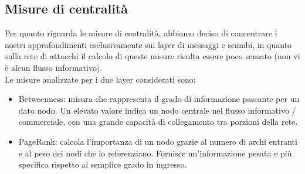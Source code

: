\subsection{Misure di centralità}
\label{subsec:centrality}
Per quanto riguarda le misure di centralità, abbiamo deciso di concentrare i nostri approfondimenti esclusivamente sui layer di messaggi e scambi, in quanto sulla rete di attacchi il calcolo di queste misure risulta essere poco sensato (non vi è alcun flusso informativo).\\
Le misure analizzate per i due layer considerati sono:
\begin{itemize}
	\item Betweenness: misura che rappresenta il grado di informazione passante per un dato nodo. Un elevato valore indica un nodo centrale nel flusso informativo / commerciale, con una grande capacità di collegamento tra porzioni della rete.
	\item PageRank: calcola l'importanza di un nodo grazie al numero di archi entranti e al peso dei nodi che lo referenziano. Fornisce un'informazione pesata e più specifica rispetto al semplice grado in ingresso.
\end{itemize}


